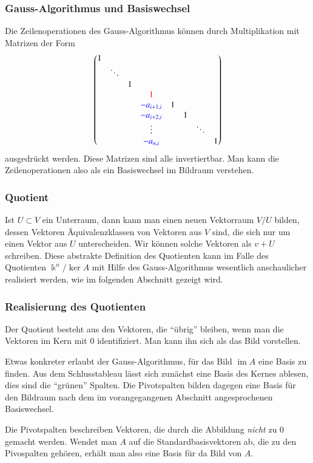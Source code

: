 \subsubsection{Gauss-Algorithmus und Basiswechsel}
Die Zeilenoperationen des Gauss-Algorithmus können durch Multiplikation
mit Matrizen der Form
\[
\begin{pmatrix}
1&      & &                        & & &      & \\
 &\ddots& &                        & & &      & \\
 &      &1&                        & & &      & \\
 &      & &{\color{red}1}          & & &      & \\
 &      & &{\color{blue}-a_{i+1,i}}&1& &      & \\
 &      & &{\color{blue}-a_{i+2,i}}& &1&      & \\
 &      & &\vdots                  & & &\ddots& \\
 &      & &{\color{blue}-a_{n,i}}  & & &      &1
\end{pmatrix}
\]
ausgedrückt werden.
Diese Matrizen sind alle invertiertbar.
Man kann die Zeilenoperationen also als ein Basiswechsel im Bildraum
verstehen.

\subsubsection{Quotient}
Ist $U\subset V$ ein Unterraum, dann kann man einen neuen Vektorraum
$V/U$ bilden, dessen Vektoren Äquivalenzklassen von Vektoren aus $V$
sind, die sich nur um einen Vektor aus $U$ unterscheiden.
Wir können solche Vektoren als $v+U$ schreiben. 
Diese abstrakte Definition des Quotienten kann im Falle 
des Quotienten $\Bbbk^n / \ker A$ mit Hilfe des
Gauss-Algorithmus wesentlich anschaulicher realisiert werden,
wie im folgenden Abschnitt gezeigt wird.

\subsubsection{Realisierung des Quotienten}
Der Quotient besteht aus den Vektoren, die ``übrig'' bleiben, wenn man die
Vektoren im Kern mit $0$ identifiziert.
Man kann ihn sich als das Bild vorstellen.

Etwas konkreter erlaubt der Gauss-Algorithmus,
für das Bild $\operatorname{im}A$ eine Basis zu finden.
Aus dem Schlusstableau lässt sich zunächst eine Basis des Kernes
ablesen, dies sind die ``grünen'' Spalten.
Die Pivotspalten bilden dagegen eine Basis für den Bildraum
nach dem im vorangegangenen Abschnitt angesprochenen Basiswechsel.

Die Pivotspalten beschreiben Vektoren, die durch die Abbildung {\em nicht}
zu $0$ gemacht werden.
Wendet man $A$ auf die Standardbasisvektoren ab, die zu den 
Pivospalten gehören, erhält man also eine Basis für da Bild
von $A$.

